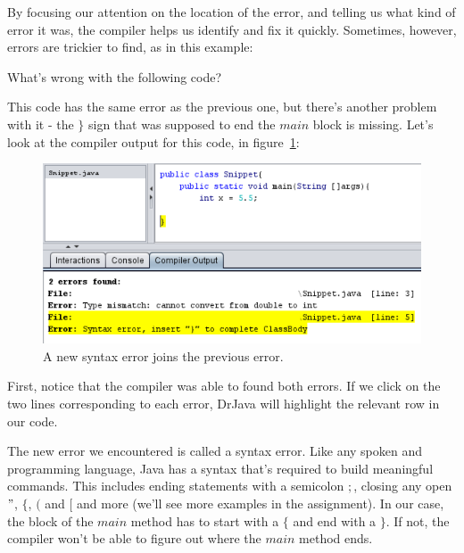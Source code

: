 By focusing our attention on the location of the error, and telling us what kind of error it was, the compiler helps us identify and fix it quickly. Sometimes, however, errors are trickier to find, as in this example:

\begin{example}
What's wrong with the following code?

\begin{code}
public class Snippet{
    public static void main(String []args){
        int x = 5.5;
    
}
\end{code}
\end{example}

This code has the same error as the previous one, but there's another problem with it - the $\}$ sign that was supposed to end the $main$ block is missing. Let's look at the compiler output for this code, in figure~\ref{fig:syntax_error}:

\begin{figure}[h!]
\centering
\includegraphics[scale=0.8]{lectures/images/syntax_error.PNG}
\caption{A new syntax error joins the previous error.}
\label{fig:syntax_error}
\end{figure}

First, notice that the compiler was able to found both errors. If we click on the two lines corresponding to each error, DrJava will highlight the relevant row in our code. 

The new error we encountered is called a syntax error. Like any spoken and programming language, Java has a syntax that's required to build meaningful commands. This includes ending statements with a semicolon $;$, closing any open $"$, $\{$, $($ and $[$ and more (we'll see more examples in the assignment). In our case, the block of the $main$ method has to start with a $\{$ and end with a $\}$. If not, the compiler won't be able to figure out where the $main$ method ends.

